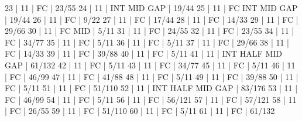 23    |  11    |    FC                                        | 23/55   
24    |  11    |        INT                  MID  GAP         | 19/44   
25    |  11    |    FC  INT                  MID  GAP         | 19/44   
26    |  11    |    FC                                        | 9/22   
27    |  11    |    FC                                        | 17/44   
28    |  11    |    FC                                        | 14/33   
29    |  11    |    FC                                        | 29/66   
30    |  11    |    FC                       MID              | 5/11   
31    |  11    |    FC                                        | 24/55   
32    |  11    |    FC                                        | 23/55   
34    |  11    |    FC                                        | 34/77   
35    |  11    |    FC                                        | 5/11   
36    |  11    |    FC                                        | 5/11   
37    |  11    |    FC                                        | 29/66   
38    |  11    |    FC                                        | 14/33   
39    |  11    |    FC                                        | 39/88   
40    |  11    |    FC                                        | 5/11   
41    |  11    |        INT  HALF            MID  GAP         | 61/132   
42    |  11    |    FC                                        | 5/11   
43    |  11    |    FC                                        | 34/77   
45    |  11    |    FC                                        | 5/11   
46    |  11    |    FC                                        | 46/99   
47    |  11    |    FC                                        | 41/88   
48    |  11    |    FC                                        | 5/11   
49    |  11    |    FC                                        | 39/88   
50    |  11    |    FC                                        | 5/11   
51    |  11    |    FC                                        | 51/110   
52    |  11    |        INT  HALF            MID  GAP         | 83/176   
53    |  11    |    FC                                        | 46/99   
54    |  11    |    FC                                        | 5/11   
56    |  11    |    FC                                        | 56/121   
57    |  11    |    FC                                        | 57/121   
58    |  11    |    FC                                        | 26/55   
59    |  11    |    FC                                        | 51/110   
60    |  11    |    FC                                        | 5/11   
61    |  11    |    FC                                        | 61/132   
